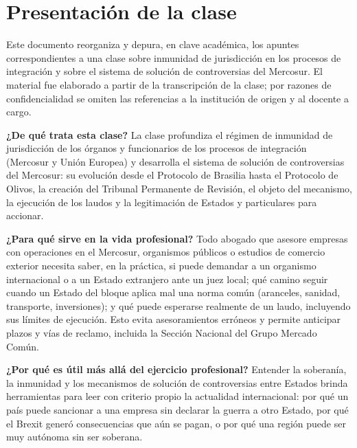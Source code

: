 \documentclass[12pt,oneside]{book}
\begin{document}
\tableofcontents

\chapter*{Presentación de la clase}

Este documento reorganiza y depura, en clave académica, los apuntes correspondientes a una clase sobre inmunidad de jurisdicción en los procesos de integración y sobre el sistema de solución de controversias del Mercosur. El material fue elaborado a partir de la transcripción de la clase; por razones de confidencialidad se omiten las referencias a la institución de origen y al docente a cargo.

\begin{note}
\textbf{¿De qué trata esta clase?} La clase profundiza el régimen de inmunidad de jurisdicción de los órganos y funcionarios de los procesos de integración (Mercosur y Unión Europea) y desarrolla el sistema de solución de controversias del Mercosur: su evolución desde el Protocolo de Brasilia hasta el Protocolo de Olivos, la creación del Tribunal Permanente de Revisión, el objeto del mecanismo, la ejecución de los laudos y la legitimación de Estados y particulares para accionar.

\textbf{¿Para qué sirve en la vida profesional?} Todo abogado que asesore empresas con operaciones en el Mercosur, organismos públicos o estudios de comercio exterior necesita saber, en la práctica, si puede demandar a un organismo internacional o a un Estado extranjero ante un juez local; qué camino seguir cuando un Estado del bloque aplica mal una norma común (aranceles, sanidad, transporte, inversiones); y qué puede esperarse realmente de un laudo, incluyendo sus límites de ejecución. Esto evita asesoramientos erróneos y permite anticipar plazos y vías de reclamo, incluida la Sección Nacional del Grupo Mercado Común.

\textbf{¿Por qué es útil más allá del ejercicio profesional?} Entender la soberanía, la inmunidad y los mecanismos de solución de controversias entre Estados brinda herramientas para leer con criterio propio la actualidad internacional: por qué un país puede sancionar a una empresa sin declarar la guerra a otro Estado, por qué el Brexit generó consecuencias que aún se pagan, o por qué una región puede ser muy autónoma sin ser soberana.
\end{note}
\end{document}
